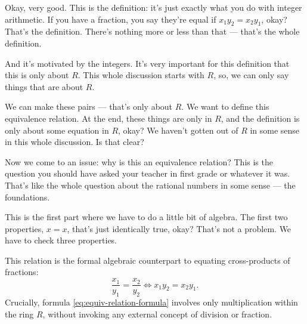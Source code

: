 \begin{speech}[00:42:06 - 00:44:08]
Okay, very good. This is the definition:  it's just exactly what you do with integer arithmetic. If you have a fraction, you say they're equal if $x_1 y_2 = x_2 y_1$, okay? That's the definition. There's nothing more or less than that --- that's the whole definition.

And it's motivated by the integers. It's very important for this definition that this is only about $R$.  This whole discussion starts with $R$, so, we can only say things that are about $R$.

We can make these pairs --- that's only about $R$. We want to define this equivalence relation. At the end, these things are only in $R$, and the definition is only about some equation in $R$, okay? We haven't gotten out of $R$ in some sense in this whole discussion. Is that clear?

Now we come to an issue: why is this an equivalence relation? This is the question you should have asked your teacher in first grade or whatever it was. That's like the whole question about the rational numbers in some sense --- the foundations.


This is the first part where we have to do a little bit of algebra. The first two properties, $x = x$, that's just identically true, okay? That's not a problem. We have to check three properties. 
\end{speech}

\begin{content}

\begin{steps}
This relation is the formal algebraic counterpart to equating cross-products of fractions:
\[
\frac{x_1}{y_1} = \frac{x_2}{y_2} \iff x_1 y_2 = x_2 y_1.
\]
Crucially, formula \eqref{eq:equiv-relation-formula} involves only multiplication within the ring $R$, without invoking any external concept of division or fraction.
\end{steps}
\end{content}

